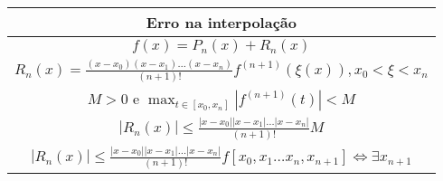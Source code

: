 \documentclass{article}
\begin{document}
\begin{minipage}[!t]{.5\textwidth}
\begin{tabularx}{\textwidth}{c}
\midrule
Erro na interpolação\\
\midrule
$f(x) = P_n(x) + R_n(x)$\\
$ R_n(x) = \frac{ (x-x_0)(x-x_1)\dots (x-x_n)}{(n+1)!}f^{(n+1)}(\xi(x)), x_0 < \xi < x_n$\\
$ M > 0 $ e $ \displaystyle \max_{t\in [x_0,x_n]} |f^{(n+1)}(t)| < M$\\
$ |R_n(x)| \leq \frac {|x-x_0||x-x_1|\dots |x-x_n|}{(n+1)!}M $\\
$ |R_n(x)| \leq \frac {|x-x_0||x-x_1|\dots |x-x_n|}{(n+1)!}f[x_0,x_1 \dotsc x_n,x_{n+1}] \iff \exists x_{n+1} $ \\
\bottomrule
\end{tabularx}\\
\end{minipage}
\newpage
\end{document}
